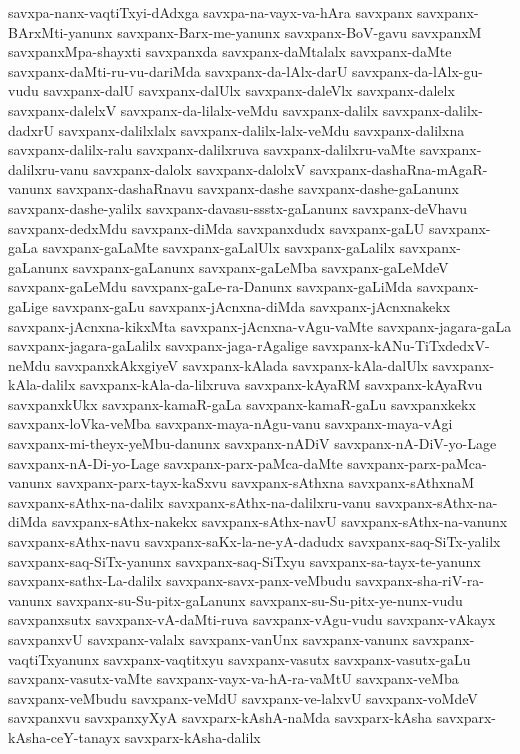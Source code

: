 {savxpa-nanx-vaqtiTxyi-dAdxga
savxpa-na-vayx-va-hAra
savxpanx
savxpanx-BArxMti-yanunx
savxpanx-Barx-me-yanunx
savxpanx-BoV-gavu
savxpanxM
savxpanxMpa-shayxti
savxpanxda
savxpanx-daMtalalx
savxpanx-daMte
savxpanx-daMti-ru-vu-dariMda
savxpanx-da-lAlx-darU
savxpanx-da-lAlx-gu-vudu
savxpanx-dalU
savxpanx-dalUlx
savxpanx-daleVlx
savxpanx-dalelx
savxpanx-dalelxV
savxpanx-da-lilalx-veMdu
savxpanx-dalilx
savxpanx-dalilx-dadxrU
savxpanx-dalilxlalx
savxpanx-dalilx-lalx-veMdu
savxpanx-dalilxna
savxpanx-dalilx-ralu
savxpanx-dalilxruva
savxpanx-dalilxru-vaMte
savxpanx-dalilxru-vanu
savxpanx-dalolx
savxpanx-dalolxV
savxpanx-dashaRna-mAgaR-vanunx
savxpanx-dashaRnavu
savxpanx-dashe
savxpanx-dashe-gaLanunx
savxpanx-dashe-yalilx
savxpanx-davasu-ssstx-gaLanunx
savxpanx-deVhavu
savxpanx-dedxMdu
savxpanx-diMda
savxpanxdudx
savxpanx-gaLU
savxpanx-gaLa
savxpanx-gaLaMte
savxpanx-gaLalUlx
savxpanx-gaLalilx
savxpanx-gaLanunx
savxpanx-gaLanunx
savxpanx-gaLeMba
savxpanx-gaLeMdeV
savxpanx-gaLeMdu
savxpanx-gaLe-ra-Danunx
savxpanx-gaLiMda
savxpanx-gaLige
savxpanx-gaLu
savxpanx-jAcnxna-diMda
savxpanx-jAcnxnakekx
savxpanx-jAcnxna-kikxMta
savxpanx-jAcnxna-vAgu-vaMte
savxpanx-jagara-gaLa
savxpanx-jagara-gaLalilx
savxpanx-jaga-rAgalige
savxpanx-kANu-TiTxdedxV-neMdu
savxpanxkAkxgiyeV
savxpanx-kAlada
savxpanx-kAla-dalUlx
savxpanx-kAla-dalilx
savxpanx-kAla-da-lilxruva
savxpanx-kAyaRM
savxpanx-kAyaRvu
savxpanxkUkx
savxpanx-kamaR-gaLa
savxpanx-kamaR-gaLu
savxpanxkekx
savxpanx-loVka-veMba
savxpanx-maya-nAgu-vanu
savxpanx-maya-vAgi
savxpanx-mi-theyx-yeMbu-danunx
savxpanx-nADiV
savxpanx-nA-DiV-yo-Lage
savxpanx-nA-Di-yo-Lage
savxpanx-parx-paMca-daMte
savxpanx-parx-paMca-vanunx
savxpanx-parx-tayx-kaSxvu
savxpanx-sAthxna
savxpanx-sAthxnaM
savxpanx-sAthx-na-dalilx
savxpanx-sAthx-na-dalilxru-vanu
savxpanx-sAthx-na-diMda
savxpanx-sAthx-nakekx
savxpanx-sAthx-navU
savxpanx-sAthx-na-vanunx
savxpanx-sAthx-navu
savxpanx-saKx-la-ne-yA-dadudx
savxpanx-saq-SiTx-yalilx
savxpanx-saq-SiTx-yanunx
savxpanx-saq-SiTxyu
savxpanx-sa-tayx-te-yanunx
savxpanx-sathx-La-dalilx
savxpanx-savx-panx-veMbudu
savxpanx-sha-riV-ra-vanunx
savxpanx-su-Su-pitx-gaLanunx
savxpanx-su-Su-pitx-ye-nunx-vudu
savxpanxsutx
savxpanx-vA-daMti-ruva
savxpanx-vAgu-vudu
savxpanx-vAkayx
savxpanxvU
savxpanx-valalx
savxpanx-vanUnx
savxpanx-vanunx
savxpanx-vaqtiTxyanunx
savxpanx-vaqtitxyu
savxpanx-vasutx
savxpanx-vasutx-gaLu
savxpanx-vasutx-vaMte
savxpanx-vayx-va-hA-ra-vaMtU
savxpanx-veMba
savxpanx-veMbudu
savxpanx-veMdU
savxpanx-ve-lalxvU
savxpanx-voMdeV
savxpanxvu
savxpanxyXyA
savxparx-kAshA-naMda
savxparx-kAsha
savxparx-kAsha-ceY-tanayx
savxparx-kAsha-dalilx
}
